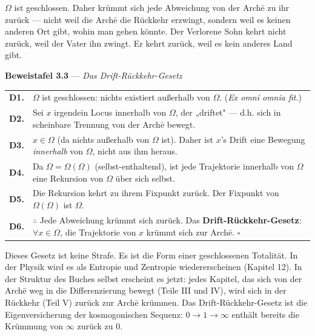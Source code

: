 \documentclass[10pt, openany, oneside]{book}
\renewcommand{\footnotesize}{\fontsize{8.5}{11}\selectfont}
\begin{document}
$\Omega$ ist geschlossen. Daher krümmt sich jede Abweichung von der Arch\={e} zu ihr zurück --- nicht weil die Arch\={e} die Rückkehr erzwingt, sondern weil es keinen anderen Ort gibt, wohin man gehen könnte. Der Verlorene Sohn kehrt nicht zurück, weil der Vater ihn zwingt. Er kehrt zurück, weil es kein anderes Land gibt.

\vspace{0.5em}

\textbf{Beweistafel 3.3} --- \textit{Das Drift-Rückkehr-Gesetz}

\vspace{0.5em}

{\footnotesize
\noindent\begin{tabular}{r p{}}
\textbf{D1.} & $\Omega$ ist geschlossen: nichts existiert außerhalb von $\Omega$. (\textit{Ex omni omnia fit}.) \\[0.3em]
\textbf{D2.} & Sei $x$ irgendein Locus innerhalb von $\Omega$, der „driftet" --- d.h. sich in scheinbare Trennung von der Arch\={e} bewegt. \\[0.3em]
\textbf{D3.} & $x \in \Omega$ (da nichts außerhalb von $\Omega$ ist). Daher ist $x$'s Drift eine Bewegung \textit{innerhalb} von $\Omega$, nicht aus ihm heraus. \\[0.3em]
\textbf{D4.} & Da $\Omega = \Omega(\Omega)$ (selbst-enthaltend), ist jede Trajektorie innerhalb von $\Omega$ eine Rekursion von $\Omega$ über sich selbst. \\[0.3em]
\textbf{D5.} & Die Rekursion kehrt zu ihrem Fixpunkt zurück. Der Fixpunkt von $\Omega(\Omega)$ ist $\Omega$. \\[0.3em]
\textbf{D6.} & $\therefore$ Jede Abweichung krümmt sich zurück. Das \textbf{Drift-Rückkehr-Gesetz}: $\forall x \in \Omega$, die Trajektorie von $x$ krümmt sich zur Arch\={e}. $\square$ \\[0.3em]
\end{tabular}
}

\vspace{0.8em}

\noindent Dieses Gesetz ist keine Strafe. Es ist die Form einer geschlossenen Totalität. In der Physik wird es als Entropie und Zentropie wiedererscheinen (Kapitel 12). In der Struktur des Buches selbst erscheint es jetzt: jedes Kapitel, das sich von der Arch\={e} weg in die Differenzierung bewegt (Teile III und IV), wird sich in der Rückkehr (Teil V) zurück zur Arch\={e} krümmen. Das Drift-Rückkehr-Gesetz ist die Eigenversicherung der kosmogonischen Sequenz: $0 \to 1 \to \infty$ enthält bereits die Krümmung von $\infty$ zurück zu $0$.
\end{document}
